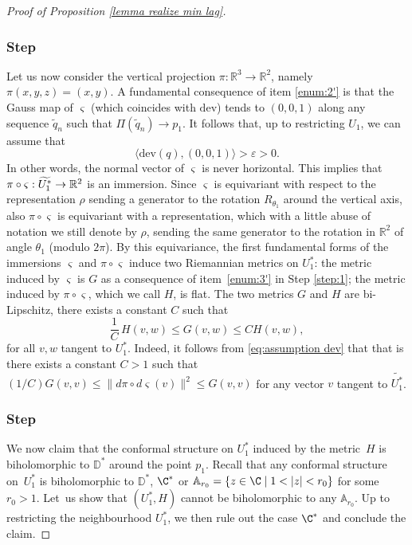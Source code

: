 \documentclass[JEP,XML,SOM,Unicode,NoEqCountersInSection,published]{cedram}
\let\epsilon\varepsilon
\newcounter{steps}
\newcommand{\step}{\refstepcounter{steps}\subsubsection*{Step \thesteps}}
\theoremstyle{definition}
\newcommand{\R}{{\mathbb R}}
\newcommand{\dev}{\mathrm{dev}}
\begin{document}
\begin{proof}[Proof of Proposition \ref{lemma realize min lag}]
\step\label{step:4}
Let us now consider the vertical projection $\pi:\R^3\to\R^2$, namely $\pi(x,y,z)=(x,y)$.
A fundamental consequence of item \eqref{enum:2'} is that the Gauss map of $\varsigma$ (which coincides with $\dev$) tends to $(0,0,1)$ along any sequence $\widetilde q_n$ such that $\Pi(\widetilde q_n)\to p_1$. It follows that, up to restricting $U_1$, we can assume that
\begin{equation}\label{eq:assumption dev}
\langle\dev(q),(0,0,1)\rangle>\epsilon> 0.
\end{equation}
In other words, the normal vector of $\varsigma$ is never horizontal.
This implies that $\pi\circ\varsigma:\widetilde{U_1^*}\to\nobreak\R^2$ is an immersion. Since $\varsigma$ is equivariant with respect to the representation $\rho$ sending a generator to the rotation $R_{\theta_1}$ around the vertical axis, also $\pi\circ\varsigma$ is equivariant with a representation, which with a little abuse of notation we still denote by $\rho$, sending the same generator to the rotation in $\R^2$ of angle $\theta_1$ (modulo $2\pi$). By this equivariance, the first fundamental forms of the immersions $\varsigma$ and $\pi\circ\varsigma$ induce two Riemannian metrics on $U_1^*$: the metric induced by $\varsigma$ is $G$ as a consequence of item~\eqref{enum:3'} in Step \ref{step:1}; the metric induced by $\pi\circ\varsigma$, which we call $H$, is flat. The two metrics $G$ and $H$ are bi-Lipschitz, \ie there exists a constant $C$ such that
\begin{equation}\label{eq:assumption bilip}
\frac{1}{C}\,H(v,w)\leq G(v,w)\leq CH(v,w),
\end{equation}
for all $v,w$ tangent to $U_1^*$. Indeed, it follows from \eqref{eq:assumption dev} that that is there exists a constant $C>1$ such that
$({1}/{C}){G(v,v)}\leq \|d\pi\circ d\varsigma(v)\|^2\leq {G(v,v)}$
for any vector $v$ tangent to $\widetilde{U_1^*}$.

\step\label{step:5}
We now claim that the conformal structure on $U_1^*$ induced by the metric~$H$ is biholomorphic to $\mathbb D^*$ around the point $p_1$. Recall that any conformal structure on~$U_1^*$ is biholomorphic to $\mathbb D^*$, $\C^*$ or $\mathbb A_{r_0}=\{z\in\C\mid1<|z|<r_0\}$ for some $r_0>1$. Let~us show that $(U_1^*,H)$ cannot be biholomorphic to any $\mathbb A_{r_0}$. Up to restricting the neighbourhood $U_1^*$, we then rule out the case $\C^*$ and conclude the claim.


\end{proof}
\end{document}
